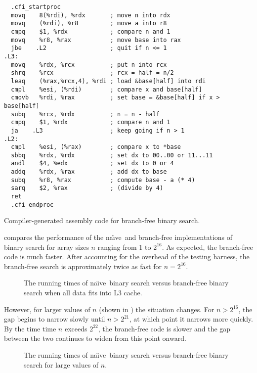 \documentclass{patmorin}
\newcommand{\lstlabel}[1]{\label{lst:#1}}
\newcommand{\naive}{na\"{\i}ve}
\begin{document}
\begin{listing}
\begin{verbatim}
  .cfi_startproc
  movq    8(%rdi), %rdx       ; move n into rdx
  movq    (%rdi), %r8         ; move a into r8
  cmpq    $1, %rdx            ; compare n and 1
  movq    %r8, %rax           ; move base into rax
  jbe    .L2                  ; quit if n <= 1
.L3:
  movq    %rdx, %rcx          ; put n into rcx
  shrq    %rcx                ; rcx = half = n/2
  leaq    (%rax,%rcx,4), %rdi ; load &base[half] into rdi
  cmpl    %esi, (%rdi)        ; compare x and base[half]
  cmovb   %rdi, %rax          ; set base = &base[half] if x > base[half]
  subq    %rcx, %rdx          ; n = n - half
  cmpq    $1, %rdx            ; compare n and 1
  ja    .L3                   ; keep going if n > 1
.L2:
  cmpl    %esi, (%rax)        ; compare x to *base
  sbbq    %rdx, %rdx          ; set dx to 00..00 or 11...11
  andl    $4, %edx            ; set dx to 0 or 4 
  addq    %rdx, %rax          ; add dx to base
  subq    %r8, %rax           ; compute base - a (* 4)
  sarq    $2, %rax            ; (divide by 4)
  ret
  .cfi_endproc
\end{verbatim}
\caption{Compiler-generated assembly code for branch-free binary search.}
\lstlabel{bfbs-asm}
\end{listing}

 compares the performance of the \naive\ and
branch-free implementations of binary search for array sizes $n$
ranging from 1 to $2^{16}$.  As expected, the branch-free code is much
faster. After accounting for the overhead of the testing harness, the
branch-free search is approximately twice as fast for $n=2^{16}$.

\begin{figure}
   \caption{The running times of \naive\ binary search versus
    branch-free binary search when all data
    fits into L3 cache.}
\end{figure}

However, for larger values of $n$ (shown in ) the
situation changes.  For $n>2^{16}$, the gap begins to narrow slowly
until $n>2^{21}$, at which point it narrows more quickly.  By the time
time $n$ exceeds $2^{22}$, the branch-free code is slower and the gap
between the two continues to widen from this point onward.

\begin{figure}
   \caption{The running times of \naive\ binary search versus
    branch-free binary search for large values of $n$.}
\end{figure}
\end{document}
